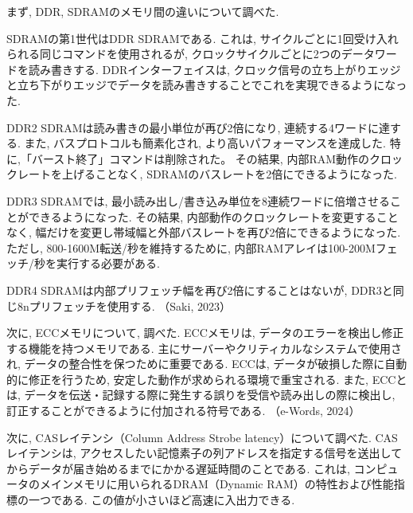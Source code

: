 \documentclass{ltjsarticle} %
\begin{document}
まず, DDR, SDRAMのメモリ間の違いについて調べた.

\vspace{0.5cm}

SDRAMの第1世代はDDR SDRAMである. 
これは, サイクルごとに1回受け入れられる同じコマンドを使用されるが, クロックサイクルごとに2つのデータワードを読み書きする.
DDRインターフェイスは, クロック信号の立ち上がりエッジと立ち下がりエッジでデータを読み書きすることでこれを実現できるようになった.

\vspace{0.5cm}

DDR2 SDRAMは読み書きの最小単位が再び2倍になり, 連続する4ワードに達する.
また, バスプロトコルも簡素化され, より高いパフォーマンスを達成した. 特に,「バースト終了」コマンドは削除された。
その結果, 内部RAM動作のクロックレートを上げることなく, SDRAMのバスレートを2倍にできるようになった.

\vspace{0.5cm}

DDR3 SDRAMでは, 最小読み出し/書き込み単位を8連続ワードに倍増させることができるようになった. 
その結果, 内部動作のクロックレートを変更することなく, 幅だけを変更し帯域幅と外部バスレートを再び2倍にできるようになった. 
ただし, 800-1600M転送/秒を維持するために, 内部RAMアレイは100-200Mフェッチ/秒を実行する必要がある.

\vspace{0.5cm}

DDR4 SDRAMは内部プリフェッチ幅を再び2倍にすることはないが, DDR3と同じ8nプリフェッチを使用する. 
（Saki, 2023）

\vspace{0.5cm}

次に, ECCメモリについて, 調べた. ECCメモリは, データのエラーを検出し修正する機能を持つメモリである. 
主にサーバーやクリティカルなシステムで使用され, データの整合性を保つために重要である. 
ECCは, データが破損した際に自動的に修正を行うため, 安定した動作が求められる環境で重宝される. 
また, ECCとは, データを伝送・記録する際に発⽣する誤りを受信や読み出しの際に検出し, 
訂正することができるように付加される符号である. （e-Words, 2024）


\vspace{0.5cm}

次に, CASレイテンシ（Column Address Strobe latency）について調べた. 
CASレイテンシは, アクセスしたい記憶素子の列アドレスを指定する信号を送出してからデータが届き始めるまでにかかる遅延時間のことである.
これは, コンピュータのメインメモリに用いられるDRAM（Dynamic RAM）の特性および性能指標の一つである.  
この値が小さいほど高速に入出力できる. 
\end{document}
